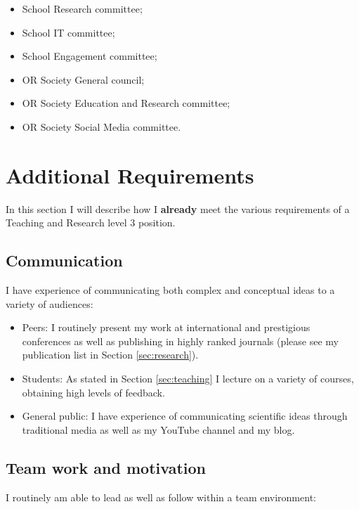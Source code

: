 \documentclass{article}
\begin{document}
\begin{itemize}
    \item School Research committee;
    \item School IT committee;
    \item School Engagement committee;
    \item OR Society General council;
    \item OR Society Education and Research committee;
    \item OR Society Social Media committee.
\end{itemize}

\section{Additional Requirements}\label{sec:additional}

In this section I will describe how I \textbf{already} meet the various requirements of a Teaching and Research level 3 position.

\subsection{Communication}

I have experience of communicating both complex and conceptual ideas to a variety of audiences:

\begin{itemize}
    \item Peers: I routinely present my work at international and prestigious conferences as well as publishing in highly ranked journals (please see my publication list in Section \ref{sec:research}).
    \item Students: As stated in Section \ref{sec:teaching} I lecture on a variety of courses, obtaining high levels of feedback.
    \item General public: I have experience of communicating scientific ideas through traditional media as well as my YouTube channel and my blog.
\end{itemize}

\subsection{Team work and motivation}

I routinely am able to lead as well as follow within a team environment:
\end{document}
